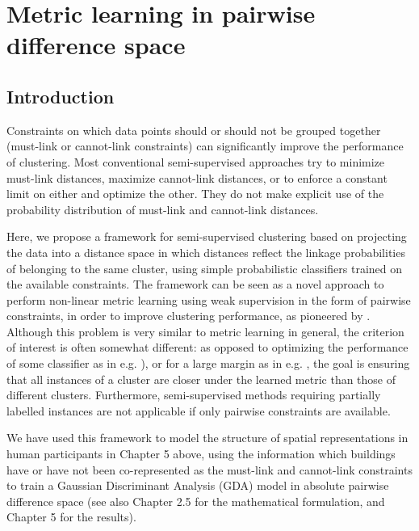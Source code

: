 \documentclass[12pt,PhD,twoside]{muthesis}
\begin{document}


\chapter{Metric learning in pairwise difference space}
\label{apx:adsmetric}

\section*{Introduction}

Constraints on which data points should or should not be grouped together (must-link or cannot-link constraints) can significantly improve the performance of clustering. Most conventional semi-supervised approaches try to minimize must-link distances, maximize cannot-link distances, or to enforce a constant limit on either and optimize the other. They do not make explicit use of the probability distribution of must-link and cannot-link distances. 

Here, we propose a framework for semi-supervised clustering based on projecting the data into a distance space in which distances reflect the linkage probabilities of belonging to the same cluster, using simple probabilistic classifiers trained on the available constraints. The framework can be seen as a novel approach to perform non-linear metric learning using weak supervision in the form of pairwise constraints, in order to improve clustering performance, as pioneered by \citep{xing2002distance}. Although this problem is very similar to metric learning in general, the criterion of interest is often somewhat different: as opposed to optimizing the performance of some classifier as in e.g. \citep{bellet2012similarity}), or for a large margin as in e.g. \citep{weinberger2005distance}, the goal is ensuring that all instances of a cluster are closer under the learned metric than those of different clusters. Furthermore, semi-supervised methods requiring partially labelled instances are not applicable if only pairwise constraints are available. 

We have used this framework to model the structure of spatial representations in human participants in Chapter 5 above, using the information which buildings have or have not been co-represented as the must-link and cannot-link constraints to train a Gaussian Discriminant Analysis (GDA) model in absolute pairwise difference space (see also Chapter 2.5 for the mathematical formulation, and Chapter 5 for the results). 
\end{document}
